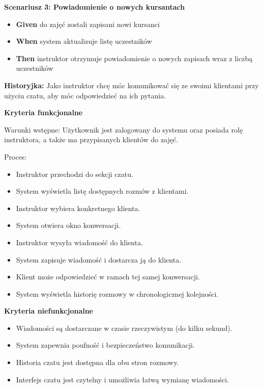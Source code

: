 \documentclass[a4paper,12pt]{article}
\begin{document}
\textbf{Scenariusz 3: Powiadomienie o nowych kursantach}
\begin{itemize}
    \item \textbf{Given} do zajęć zostali zapisani nowi kursanci
    \item \textbf{When} system aktualizuje listę uczestników
    \item \textbf{Then} instruktor otrzymuje powiadomienie o nowych zapisach wraz z liczbą uczestników
\end{itemize}

\vspace{0,5cm}

\noindent \textbf{Historyjka:} Jako instruktor chcę móc komunikować się ze swoimi klientami przy użyciu czatu, aby móc odpowiedzieć na ich pytania.

\vspace{0,2cm}

\noindent \textbf{Kryteria funkcjonalne}

\vspace{0,2cm}

\noindent Warunki wstępne: Użytkownik jest zalogowany do systemu oraz posiada rolę instruktora, a także ma przypisanych klientów do zajęć.

\vspace{0,2cm}

\noindent Proces:

\begin{itemize}
    \item Instruktor przechodzi do sekcji czatu.
    \item System wyświetla listę dostępnych rozmów z klientami.
    \item Instruktor wybiera konkretnego klienta.
    \item System otwiera okno konwersacji.
    \item Instruktor wysyła wiadomość do klienta.
    \item System zapisuje wiadomość i dostarcza ją do klienta.
    \item Klient może odpowiedzieć w ramach tej samej konwersacji.
    \item System wyświetla historię rozmowy w chronologicznej kolejności.
\end{itemize}

\noindent \textbf{Kryteria niefunkcjonalne}
\begin{itemize}
    \item Wiadomości są dostarczane w czasie rzeczywistym (do kilku sekund).
    \item System zapewnia poufność i bezpieczeństwo komunikacji.
    \item Historia czatu jest dostępna dla obu stron rozmowy.
    \item Interfejs czatu jest czytelny i umożliwia łatwą wymianę wiadomości.
\end{itemize}
\end{document}
